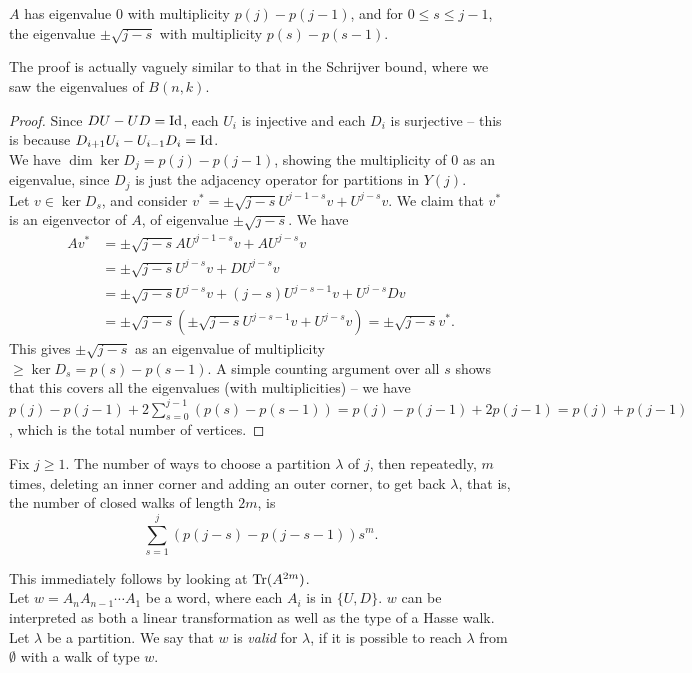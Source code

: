 \begin{ftheo}
	$A$ has eigenvalue $0$ with multiplicity $p(j) - p(j-1)$, and for $0 \le s \le j-1$, the eigenvalue $\pm \sqrt{j-s}$ with multiplicity $p(s)-p(s-1)$.
\end{ftheo}
The proof is actually vaguely similar to that in the Schrijver bound, where we saw the eigenvalues of $B(n,k)$.
\begin{proof}
	Since $DU-UD = \operatorname{Id}$, each $U_i$ is injective and each $D_i$ is surjective -- this is because $D_{i+1} U_i - U_{i-1} D_i = \operatorname{Id}$.\\
	We have $\dim \ker D_j = p(j) - p(j-1)$, showing the multiplicity of $0$ as an eigenvalue, since $D_j$ is just the adjacency operator for partitions in $Y(j)$.\\
	Let $v \in \ker D_s$, and consider $v^* = \pm \sqrt{j-s} U^{j-1-s}v + U^{j-s}v$. We claim that $v^*$ is an eigenvector of $A$, of eigenvalue $\pm\sqrt{j-s}$. We have
	\begin{align*}
		Av^* &= \pm\sqrt{j-s}AU^{j-1-s}v + AU^{j-s}v \\
			&= \pm\sqrt{j-s}U^{j-s}v + DU^{j-s}v \\
			&= \pm \sqrt{j-s}U^{j-s}v + (j-s)U^{j-s-1}v + U^{j-s}Dv \\
			&= \pm\sqrt{j-s}\left( \pm\sqrt{j-s}U^{j-s-1}v + U^{j-s}v \right) = \pm\sqrt{j-s}v^*.
	\end{align*}
	This gives $\pm \sqrt{j-s}$ as an eigenvalue of multiplicity $\ge \ker D_s = p(s) - p(s-1)$. A simple counting argument over all $s$ shows that this covers all the eigenvalues (with multiplicities) -- we have $p(j) - p(j-1) + 2\sum_{s=0}^{j-1} (p(s) - p(s-1)) = p(j) - p(j-1) + 2p(j-1) = p(j) + p(j-1)$, which is the total number of vertices.
\end{proof}

\begin{fcor}
	Fix $j \ge 1$. The number of ways to choose a partition $\lambda$ of $j$, then repeatedly, $m$ times, deleting an inner corner and adding an outer corner, to get back $\lambda$, that is, the number of closed walks of length $2m$, is 
	\[ \sum_{s=1}^{j} (p(j-s) - p(j-s-1)) s^m. \]
\end{fcor}
This immediately follows by looking at $\operatorname{Tr}(A^{2m})$.\\

Let $w = A_n A_{n-1} \cdots A_1$ be a word, where each $A_i$ is in $\{U,D\}$. $w$ can be interpreted as both a linear transformation as well as the type of a Hasse walk.\\
Let $\lambda$ be a partition. We say that $w$ is \emph{valid} for $\lambda$, if it is possible to reach $\lambda$ from $\emptyset$ with a walk of type $w$.

